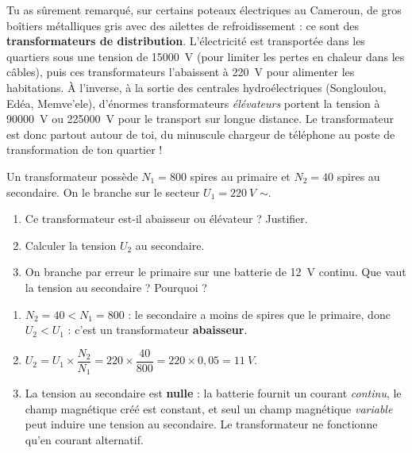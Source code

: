 \documentclass[11pt]{article}
\begin{document}
\begin{savaistu}
Tu as sûrement remarqué, sur certains poteaux électriques au Cameroun, de gros boîtiers métalliques gris avec des ailettes de refroidissement : ce sont des \textbf{transformateurs de distribution}. L'électricité est transportée dans les quartiers sous une tension de \SI{15000}{V} (pour limiter les pertes en chaleur dans les câbles), puis ces transformateurs l'abaissent à \SI{220}{V} pour alimenter les habitations. À l'inverse, à la sortie des centrales hydroélectriques (Songloulou, Edéa, Memve'ele), d'énormes transformateurs \emph{élévateurs} portent la tension à \SI{90000}{V} ou \SI{225000}{V} pour le transport sur longue distance. Le transformateur est donc partout autour de toi, du minuscule chargeur de téléphone au poste de transformation de ton quartier !
\end{savaistu}

\begin{exercice}
Un transformateur possède $N_1 = 800$ spires au primaire et $N_2 = 40$ spires au secondaire. On le branche sur le secteur $U_1 = \SI{220}{V}$ $\sim$.
\begin{enumerate}
\item Ce transformateur est-il abaisseur ou élévateur ? Justifier.
\item Calculer la tension $U_2$ au secondaire.
\item On branche par erreur le primaire sur une batterie de \SI{12}{V} continu. Que vaut la tension au secondaire ? Pourquoi ?
\end{enumerate}
\end{exercice}

\begin{corrige}[Exercice]
\begin{enumerate}
\item $N_2 = 40 < N_1 = 800$ : le secondaire a moins de spires que le primaire, donc $U_2 < U_1$ : c'est un transformateur \textbf{abaisseur}.
\item $U_2 = U_1 \times \dfrac{N_2}{N_1} = 220 \times \dfrac{40}{800} = 220 \times 0,05 = \SI{11}{V}$.
\item La tension au secondaire est \textbf{nulle} : la batterie fournit un courant \emph{continu}, le champ magnétique créé est constant, et seul un champ magnétique \emph{variable} peut induire une tension au secondaire. Le transformateur ne fonctionne qu'en courant alternatif.
\end{enumerate}
\end{corrige}
\end{document}
